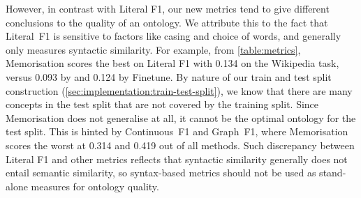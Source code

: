 However, in contrast with Literal F1, our new metrics tend to give different conclusions to the quality of an ontology. We attribute this to the fact that Literal~F1 is sensitive to factors like casing and choice of words, and generally only measures syntactic similarity. For example, from \cref{table:metrics}, Memorisation scores the best on Literal F1 with 0.134 on the Wikipedia task, versus 0.093 by \name and 0.124 by Finetune. By nature of our train and test split construction (\cref{sec:implementation:train-test-split}), we know that there are many concepts in the test split that are not covered by the training split. Since Memorisation does not generalise at all, it cannot be the optimal ontology for the test split. This is hinted by Continuous~F1 and Graph~F1, where Memorisation scores the worst at 0.314 and 0.419 out of all methods. Such discrepancy between Literal F1 and other metrics reflects that syntactic similarity generally does not entail semantic similarity, so syntax-based metrics should not be used as stand-alone measures for ontology quality.





